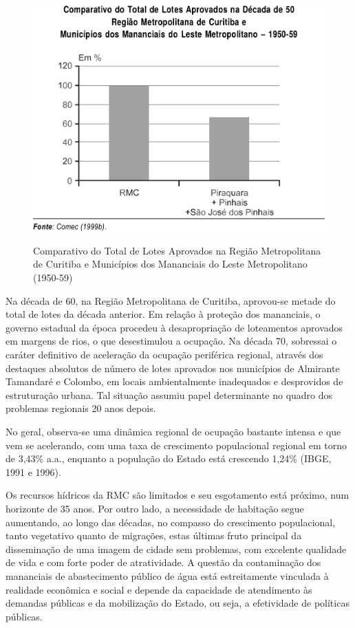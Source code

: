 	\begin{figure}
		\centering
		\caption{Comparativo do Total de Lotes Aprovados na Região Metropolitana de Curitiba e Municípios dos Mananciais do Leste Metropolitano (1950-59)}
		\includegraphics[width=0.6\linewidth]{img/lima2001a_01}
		\label{fig:lima2001a_01}
	\end{figure}

	Na década de 60, na Região Metropolitana de Curitiba, aprovou-se metade do total de lotes da década anterior. Em relação à proteção dos mananciais, o governo estadual da época procedeu à desapropriação de loteamentos aprovados em margens de rios, o que desestimulou a ocupação. Na década 70, sobressai o caráter definitivo de aceleração da ocupação periférica regional, através dos destaques absolutos de número de lotes aprovados nos municípios de Almirante Tamandaré e Colombo, em locais ambientalmente inadequados e desprovidos de estruturação urbana. Tal situação assumiu papel determinante no quadro dos problemas regionais 20 anos depois.
	
	No geral, observa-se uma dinâmica regional de ocupação bastante intensa e que vem se acelerando, com uma taxa de crescimento populacional regional em torno de 3,43\% a.a., enquanto a população do Estado está crescendo 1,24\% (IBGE, 1991 e 1996).
	
	Os recursos hídricos da RMC são limitados e seu esgotamento está próximo, num horizonte de 35 anos. Por outro lado, a necessidade de habitação segue aumentando, ao longo das décadas, no compasso do crescimento populacional, tanto vegetativo quanto de migrações, estas últimas fruto principal da disseminação de uma imagem de cidade sem problemas, com excelente qualidade de vida e com forte poder de atratividade. A questão da contaminação dos mananciais de abastecimento público de água está estreitamente vinculada à realidade econômica e social e depende da capacidade de atendimento às demandas públicas e da mobilização do Estado, ou seja, a efetividade de políticas públicas.
	
